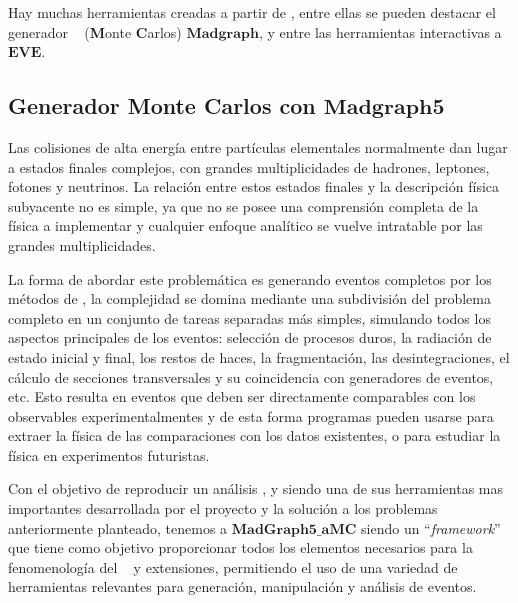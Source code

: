 Hay muchas herramientas creadas a partir de \ROOT, entre ellas se pueden destacar el generador \MC ~ (\textbf{M}onte \textbf{C}arlos) $\mathbf{Madgraph}$, y entre las herramientas interactivas a $\mathbf{EVE}$.



\subsection{Generador Monte Carlos con $\mathbf{Madgraph5}$}\label{C_madgraph}

Las colisiones de alta energía entre partículas elementales normalmente dan lugar a estados finales complejos, con grandes multiplicidades de hadrones, leptones, fotones y neutrinos. La relación entre estos estados finales y la descripción física subyacente no es simple, ya que no se posee una comprensión completa de la física a implementar y cualquier enfoque analítico se vuelve intratable por las grandes multiplicidades.

La forma de abordar este problemática es generando eventos completos por los métodos de \MC, la complejidad se domina mediante una subdivisión del problema completo en un conjunto de tareas separadas más simples, simulando todos los aspectos principales de los eventos: selección de procesos duros, la radiación de estado inicial y final, los restos de haces, la fragmentación, las desintegraciones, el cálculo de secciones transversales y su coincidencia con generadores de eventos, etc. Esto resulta en eventos que deben ser directamente comparables con los observables experimentalmentes y de esta forma programas pueden usarse para extraer la física de las comparaciones con los datos existentes, o para estudiar la física en experimentos futuristas.

Con el objetivo de reproducir un análisis \LHC, y siendo una de sus herramientas mas importantes desarrollada por el proyecto y la solución a los problemas anteriormente planteado, tenemos a $\mathbf{MadGraph5\_aMC}$ \citep{alwall_automated_2014} siendo un ``\textit{framework}'' que tiene como objetivo proporcionar todos los elementos necesarios para la fenomenología del \ME ~ y extensiones, permitiendo el uso de una variedad de herramientas relevantes para generación, manipulación y análisis de eventos. 

